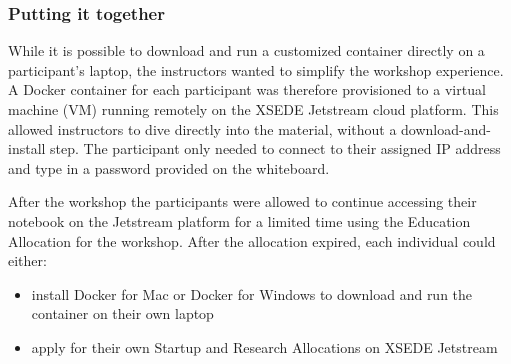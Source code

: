 \subsubsection{Putting it together}


While it is possible to download and run a customized container directly on a
participant’s laptop, the instructors wanted to simplify the workshop
experience. A Docker container for each participant was therefore provisioned to
a virtual machine (VM) running remotely on the XSEDE Jetstream cloud platform.
This allowed instructors to dive directly into the material, without a
download-and-install step. The participant only needed to connect to their
assigned IP address and type in a password provided on the whiteboard.

After the workshop the participants were allowed to continue accessing their
notebook on the Jetstream platform for a limited time using the Education
Allocation for the workshop. After the allocation expired, each individual could
either:

\begin{itemize}

\item install Docker for Mac or Docker for Windows to download and run the
container on their own laptop

\item apply for their own Startup and Research Allocations on XSEDE Jetstream

\end{itemize}
